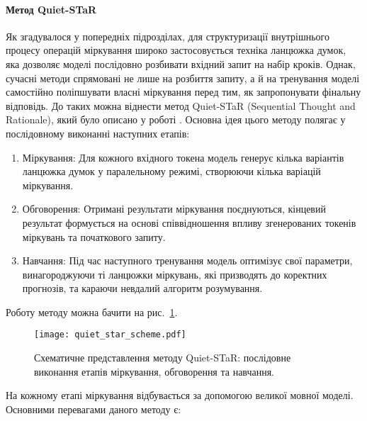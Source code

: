 \paragraph{Метод Quiet-STaR}
Як згадувалося у попередніх підрозділах, для структуризації внутрішнього процесу операцій міркування широко застосовується техніка ланцюжка думок, яка дозволяє моделі послідовно розбивати вхідний запит на набір кроків. Однак, сучасні методи спрямовані не лише на розбиття запиту, а й на тренування моделі самостійно поліпшувати власні міркування перед тим, як запропонувати фінальну відповідь. До таких можна віднести метод Quiet-STaR (Sequential Thought and Rationale), який було описано у роботі \cite{zelikman2024quietstarlanguagemodelsteach}. Основна ідея цього методу полягає у послідовному виконанні наступних етапів:
\begin{enumerate}
    \item {Міркування:} Для кожного вхідного токена модель генерує кілька варіантів ланцюжка думок у паралельному режимі, створюючи кілька варіацій міркування.
    \item {Обговорення:} Отримані результати міркування поєднуються, кінцевий результат формується на основі співвідношення впливу згенерованих токенів міркувань та початкового запиту.
    \item {Навчання:} Під час наступного тренування модель оптимізує свої параметри, винагороджуючи ті ланцюжки міркувань, які призводять до коректних прогнозів, та караючи невдалий алгоритм розумування.
\end{enumerate}

Роботу методу можна бачити на рис.~\ref{fig:quiet_star_scheme}.

\begin{figure}[h]
    \centering
    \texttt{[image: quiet\_star\_scheme.pdf]}
    \caption{Схематичне представлення методу Quiet-STaR: послідовне виконання етапів міркування, обговорення та навчання.}
    \label{fig:quiet_star_scheme}
\end{figure}

На кожному етапі міркування відбувається за допомогою великої мовної моделі. Основними перевагами даного методу є:

